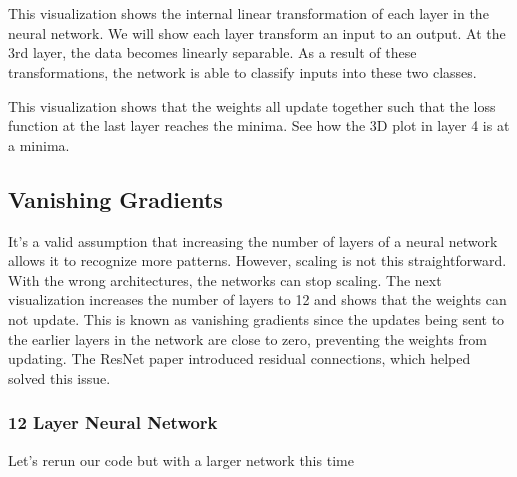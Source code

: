 \documentclass[openany]{book}
\begin{document}
    \begin{center}
    \end{center}
    { \hspace*{\fill} \\}
    
    \begin{center}
    \end{center}
    { \hspace*{\fill} \\}
    
    This visualization shows the internal linear transformation of each
layer in the neural network. We will show each layer transform an input
to an output. At the 3rd layer, the data becomes linearly separable. As
a result of these transformations, the network is able to classify
inputs into these two classes.
        
    This visualization shows that the weights all update together such that
the loss function at the last layer reaches the minima. See how the 3D
plot in layer 4 is at a minima.
        
    \subsection{Vanishing Gradients}\label{vanishing-gradients}

It's a valid assumption that increasing the number of layers of a neural
network allows it to recognize more patterns. However, scaling is not
this straightforward. With the wrong architectures, the networks can
stop scaling. The next visualization increases the number of layers to
12 and shows that the weights can not update. This is known as vanishing
gradients since the updates being sent to the earlier layers in the
network are close to zero, preventing the weights from updating. The
ResNet paper introduced residual connections, which helped solved this
issue.

    \subsubsection{12 Layer Neural Network}\label{layer-neural-network}

Let's rerun our code but with a larger network this time
\end{document}
